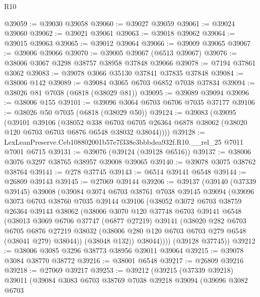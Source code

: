 \begin{lexlean}{R10}
\begin{coremodule}
@39059 := @39030 @39058
@39060 := @39027 @39059
@39061 := @39024 @39060
@39062 := @39021 @39061
@39063 := @39018 @39062
@39064 := @39015 @39063
@39065 := @39012 @39064
@39066 := @39009 @39065
@39067 := @39006 @39066
@39070 := @39005 @39067 (@6513 @39067)
@39076 := @38006 @3067 @3298 @38757 @38958 @37848 @39066
@39078 := @7194 @37861 @3062
@39083 := @39078 @3066 @35130 @37841 @37835 @37848
@39084 := @38006 @142
@39089 := @39084 @3065 @6703 @6852 @7038 @37834
@39094 := @38026 @81 @7038 (@6818 (@38029 @81))
@39095 := @39089 @39094
@39096 := @38006 @155
@39101 := @39096 @3064 @6703 @6706 @7035 @37177
@39106 := @38026 @50 @7035 (@6818 (@38029 @50))
@39124 := @39083
    (@39095
      (@39101
        @39106
        (@38052
          @338
          @6703
          @6705
          @26364
          @6878
          @38062
          (@38020 @120 @6703 @6703 @6876 @6548 @38032 @38044))))
@39128 := LexLeanPreserve.Ceb108802001b57e7f338e3bbbdea932f.R10.__rel_25 @7011 @7001 @6715
@39131 := @39076 (@39124 (@39128 @6516))
@39137 := @38006 @3076 @3297 @38765 @38957 @39008 @39065
@39140 := @39078 @3075 @38762 @38764
@39141 := @278 @37745
@39143 := @6514 @39141 @6548
@39144 := @26809 @39143
@39145 := @27069 @39144
@39206 := @39137
    (@39140
      (@37339 @39145)
      @39008
      (@39084
        @3074
        @6703
        @38761
        @7038
        @39145
        @39094
        (@39096
          @3073
          @6703
          @38760
          @7035
          @39144
          @39106
          (@38052
            @3072
            @6703
            @38759
            @26364
            @39143
            @38062
            (@38006
              @3070
              @120
              @37748
              @6703
              @39141
              @6548
              (@38013
                @3069
                @6706
                @37747
                (@6877 @27219)
                @39141
                (@38020
                  @282
                  @6703
                  @6705
                  @6876
                  @27219
                  @38032
                  (@38006 @280 @120 @6703 @6703 @279 @6548 (@38041 @279) @38044))
                (@38048 @132))
              @38044))))
      (@39128 @37745))
@39212 := @38006 @3085 @3296 @38773 @38956 @39011 @39064
@39215 := @39078 @3084 @38770 @38772
@39216 := @38001 @6548
@39217 := @26809 @39216
@39218 := @27069 @39217
@39253 := @39212
    (@39215
      (@37339 @39218)
      @39011
      (@39084
        @3083
        @6703
        @38769
        @7038
        @39218
        @39094
        (@39096
          @3082
          @6703

\end{coremodule}
\end{lexlean}
